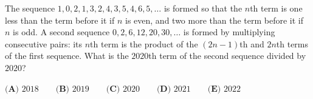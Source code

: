 The sequence $1,0,2,1,3,2,4,3,5,4,6,5,\ldots$ is formed so that the $n$th term is one less than the term before it if $n$ is even, and two more than the term before it if $n$ is odd. A second sequence $0,2,6,12,20,30,\ldots$ is formed by multiplying consecutive pairs: its $n$th term is the product of the $(2n-1)$th and $2n$th terms of the first sequence. What is the $2020$th term of the second sequence divided by $2020$?

$\textbf{(A) }2018\qquad\textbf{(B) }2019\qquad\textbf{(C) }2020\qquad\textbf{(D) }2021\qquad\textbf{(E) }2022$
